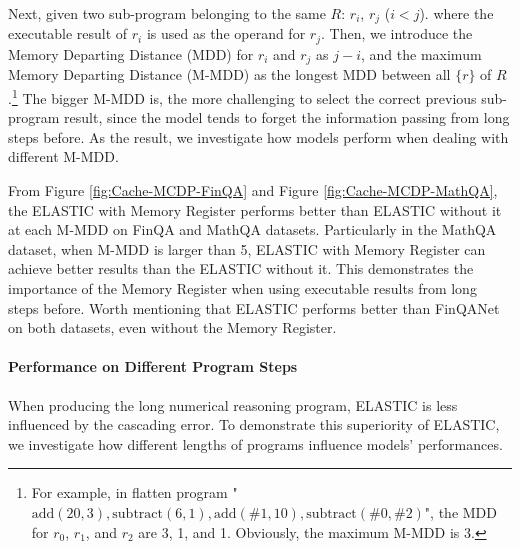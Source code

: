 \documentclass{article}
\begin{document}
Next, given two sub-program belonging to the same \(R\): \(r_{i}\), \(r_{j}\) (\(i < j\)). where the executable result of \(r_{i}\) is used as the operand for \(r_{j}\). Then, we introduce the Memory Departing Distance (MDD) for \(r_{i}\) and \(r_{j}\) as \(j - i\), and the maximum Memory Departing Distance (M-MDD) as the longest MDD between all \(\{r\}\) of \(R\).\footnote{For example, in flatten program "\(\text{add} (20, 3), \text{subtract} (6, 1),  \text{add} (\#1, 10), \text{subtract} (\#0, \#2) \)", the MDD for \(r_{0}\), \(r_{1}\), and \(r_{2}\) are 3, 1, and 1. Obviously, the maximum M-MDD is 3.} The bigger M-MDD is, the more challenging to select the correct previous sub-program result, since the model tends to forget the information passing from long steps before. As the result, we investigate how models perform when dealing with different M-MDD.

From Figure \ref{fig:Cache-MCDP-FinQA} and Figure \ref{fig:Cache-MCDP-MathQA}, the ELASTIC with Memory Register performs better than ELASTIC without it at each M-MDD on FinQA and MathQA datasets. Particularly in the MathQA dataset, when M-MDD is larger than 5, ELASTIC with Memory Register can achieve better results than the ELASTIC without it. This demonstrates the importance of the Memory Register when using executable results from long steps before. Worth mentioning that ELASTIC performs better than FinQANet on both datasets, even without the Memory Register.



\paragraph{Performance on Different Program Steps}

When producing the long numerical reasoning program, ELASTIC is less influenced by the cascading error. To demonstrate this superiority of ELASTIC, we investigate how different lengths of programs influence models' performances.
\end{document}
